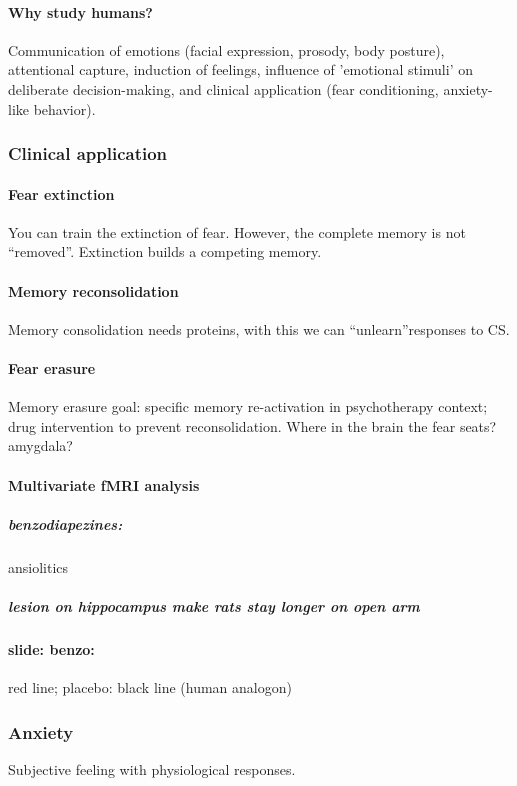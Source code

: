 \documentclass[12pt,article,oneside,a4paper]{memoir}
\begin{document}
\paragraph{Why study humans?}
Communication of emotions (facial expression, prosody, body posture),
attentional capture, induction of feelings, influence of 'emotional stimuli' on
deliberate decision-making, and clinical application (fear conditioning,
anxiety-like behavior).

\subsubsection{Clinical application}
\paragraph{Fear extinction}
You can train the extinction of fear. However, the complete memory is not
``removed''. Extinction builds a competing memory.
\paragraph{Memory reconsolidation}
Memory consolidation needs proteins, with this we can ``unlearn''responses to
CS.

\paragraph{Fear erasure}
Memory erasure goal: specific memory re-activation in psychotherapy context;
drug intervention to prevent reconsolidation.
Where in the brain the fear seats? amygdala?

\paragraph{Multivariate fMRI analysis}
\subparagraph{benzodiapezines:} ansiolitics
\subparagraph{lesion on hippocampus make rats stay longer on open arm}
\paragraph{slide: benzo:} red line; placebo: black line (human analogon)

\subsubsection{Anxiety}
Subjective feeling with physiological responses.

\newpage
\end{document}
